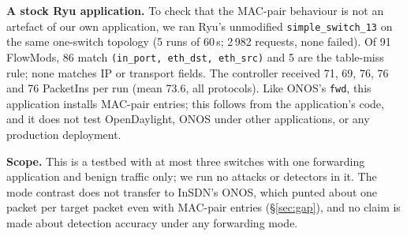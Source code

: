 

\textbf{A stock Ryu application.} To check that the MAC-pair behaviour is not an artefact of our own application, we ran Ryu's
unmodified \texttt{simple\_switch\_13} on the same one-switch topology (5 runs of 60\,s; 2\,982 requests, none failed). Of 91 FlowMods, 86
match \texttt{(in\_port, eth\_dst, eth\_src)} and 5 are the table-miss rule; none matches IP or transport fields. The controller
received 71, 69, 76, 76 and 76 PacketIns per run (mean 73.6, all protocols). Like ONOS's \texttt{fwd}, this application installs MAC-pair
entries; this follows from the application's code, and it does not test OpenDaylight, ONOS under other applications, or any production
deployment.

\textbf{Scope.} This is a testbed with at most three switches with one forwarding application and benign traffic only; we run no
attacks or detectors in it. The mode contrast does not transfer to InSDN's ONOS, which punted about one packet per
target packet even with MAC-pair entries (\S\ref{sec:gap}), and no claim is made about detection accuracy under any
forwarding mode.
